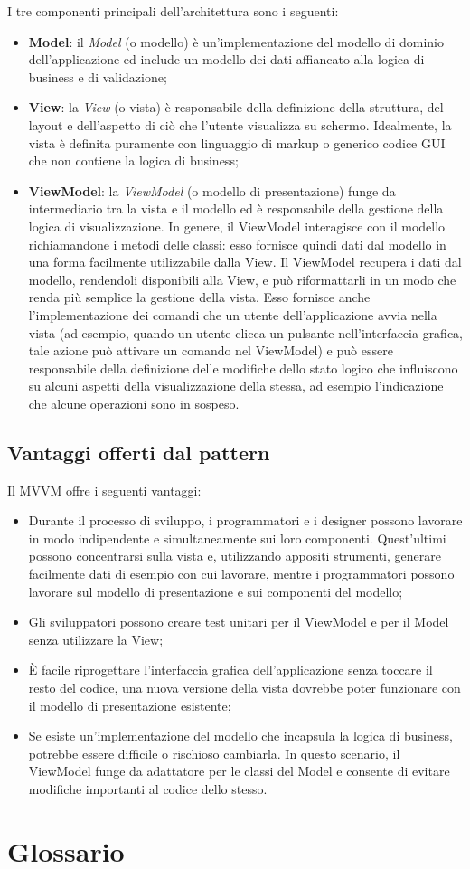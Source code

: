 \documentclass[openany,12pt,a4paper]{report}
\begin{document}
	\noindent I tre componenti principali dell'architettura sono i seguenti:
	\begin{itemize}
		\item \textbf{Model}: il \textit{Model} (o modello) è un'implementazione del modello di dominio dell'applicazione ed include un modello dei dati affiancato alla logica di business e di validazione;
		\item \textbf{View}: la \textit{View} (o vista) è responsabile della definizione della struttura, del layout e dell'aspetto di ciò che l'utente visualizza su schermo. Idealmente, la vista è definita puramente con linguaggio di markup o generico codice GUI che non contiene la logica di business;
		\item \textbf{ViewModel}: la \textit{ViewModel} (o modello di presentazione) funge da intermediario tra la vista e il modello ed è responsabile della gestione della logica di visualizzazione. In genere, il ViewModel interagisce con il modello richiamandone i metodi delle classi: esso fornisce quindi dati dal modello in una forma facilmente utilizzabile dalla View. Il ViewModel recupera i dati dal modello, rendendoli disponibili alla View, e può riformattarli in un modo che renda più semplice la gestione della vista. Esso fornisce anche l'implementazione dei comandi che un utente dell'applicazione avvia nella vista (ad esempio, quando un utente clicca un pulsante nell'interfaccia grafica, tale azione può attivare un comando nel ViewModel) e può essere responsabile della definizione delle modifiche dello stato logico che influiscono su alcuni aspetti della visualizzazione della stessa, ad esempio l'indicazione che alcune operazioni sono in sospeso.
	\end{itemize}

	\section{Vantaggi offerti dal pattern}
	Il MVVM offre i seguenti vantaggi:
	
	\begin{itemize}
		\item Durante il processo di sviluppo, i programmatori e i designer possono lavorare in modo indipendente e simultaneamente sui loro componenti. Quest'ultimi possono concentrarsi sulla vista e, utilizzando appositi strumenti, generare facilmente dati di esempio con cui lavorare, mentre i programmatori possono lavorare sul modello di presentazione e sui componenti del modello;
		\item Gli sviluppatori possono creare test unitari per il ViewModel e per il Model senza utilizzare la View;
		\item È facile riprogettare l'interfaccia grafica dell'applicazione senza toccare il resto del codice, una nuova versione della vista dovrebbe poter funzionare con il modello di presentazione esistente;
		\item Se esiste un'implementazione del modello che incapsula la logica di business, potrebbe essere difficile o rischioso cambiarla. In questo scenario, il ViewModel funge da adattatore per le classi del Model e consente di evitare modifiche importanti al codice dello stesso.	
	\end{itemize}

	\chapter{Glossario}
	
\end{document}
